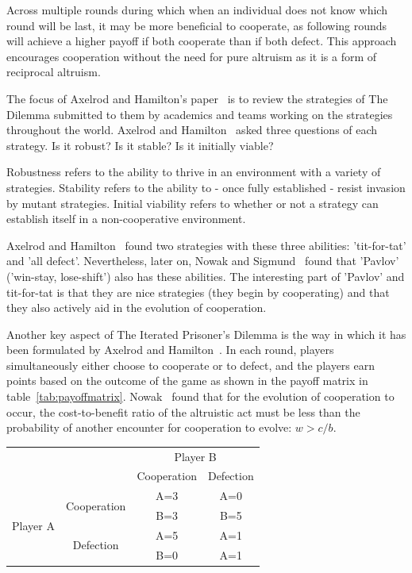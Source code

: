 \documentclass[]{final_report}
\begin{document}
Across multiple rounds during which when an individual does not know which round will be last, it may be more beneficial to cooperate, as following rounds will achieve a higher payoff if both cooperate than if both defect. This approach encourages cooperation without the need for pure altruism as it is a form of reciprocal altruism.\par
The focus of Axelrod and Hamilton's paper~\cite{evolution_of_cooperation} is to review the strategies of The Dilemma submitted to them by academics and teams working on the strategies throughout the world. Axelrod and Hamilton~\cite{evolution_of_cooperation} asked three questions of each strategy. Is it robust? Is it stable? Is it initially viable?\par
Robustness refers to the ability to thrive in an environment with a variety of strategies. Stability refers to the ability to - once fully established - resist invasion by mutant strategies. Initial viability refers to whether or not a strategy can establish itself in a non-cooperative environment.\par
Axelrod and Hamilton~\cite{evolution_of_cooperation} found two strategies with these three abilities: 'tit-for-tat' and 'all defect'. Nevertheless, later on, Nowak and Sigmund~\cite{nowak-1993a} found that 'Pavlov' ('win-stay, lose-shift') also has these abilities. The interesting part of 'Pavlov' and tit-for-tat is that they are nice strategies (they begin by cooperating) and that they also actively aid in the evolution of cooperation.\par
Another key aspect of The Iterated Prisoner's Dilemma is the way in which it has been formulated by Axelrod and Hamilton~\cite{evolution_of_cooperation}. In each round, players simultaneously either choose to cooperate or to defect, and the players earn points based on the outcome of the game as shown in the payoff matrix in table~\ref{tab:payoffmatrix}. Nowak~\cite{five_rules_coop} found that for the evolution of cooperation to occur, the cost-to-benefit ratio of the altruistic act must be less than the probability of another encounter for cooperation to evolve: $w>c/b$.\par
\begin{framed}
	\begin{center}
		\begin{tabular}{cc|c|c}
		& & \multicolumn{2}{c}{Player B}\\
		& & Cooperation & Defection\\
		\cline{1-4}
		\multirow{4}{*}{Player A} &\multirow{2}{*}{Cooperation} & A=3 & A=0\\
		& & B=3 & B=5\\
		\cline{2-4}
		& \multirow{2}{*}{Defection} & A=5 & A=1\\
		& & B=0 & A=1\\
		\end{tabular}
		\label{tab:payoffmatrix}
	\end{center}	
\end{framed}
\end{document}
